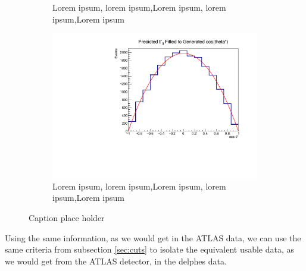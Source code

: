 \documentclass[12pt,a4paper]{article}
\begin{document}
\begin{figure}[t!]
\begin{subfigure}[t]{0.5\textwidth}
        \caption{Lorem ipsum, lorem ipsum,Lorem ipsum, lorem ipsum,Lorem ipsum}
      \end{subfigure}
    \begin{subfigure}[t]{0.5\textwidth}
        \centering
        \includegraphics[width=1.0\textwidth]{figures/delphes_gen0}
        \caption{Lorem ipsum, lorem ipsum,Lorem ipsum, lorem ipsum,Lorem ipsum}
    \end{subfigure}
    \caption{Caption place holder}
\end{figure}
Using the same information, as we would get in the ATLAS data, we can use the
same criteria from subsection \ref{sec:cuts} to isolate the equivalent usable
data, as we would get from the ATLAS detector, in the delphes data.
\end{document}
